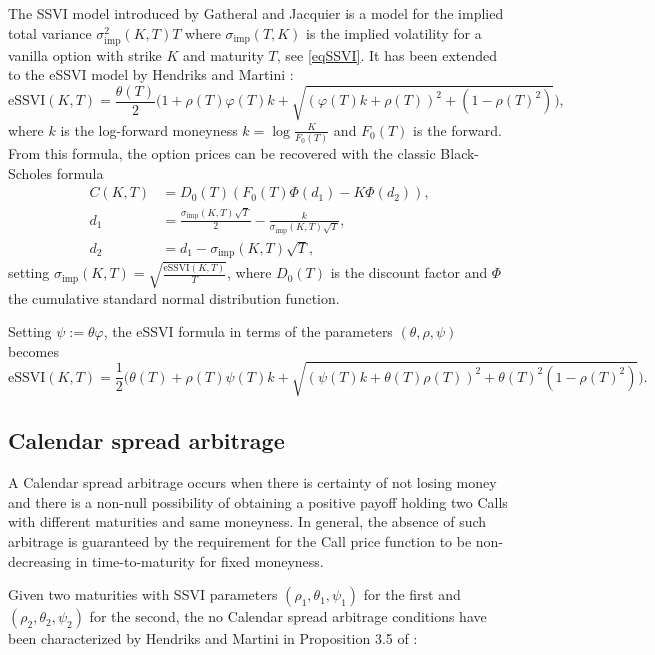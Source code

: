 \documentclass{article}
\begin{document}
	The SSVI model introduced by Gatheral and Jacquier
\cite{gatheral2014arbitrage} is a model for the implied total variance
\(\sigma^2_{\text{imp}}(K,T)T\) where \(\sigma_{\text{imp}}(T,K)\) is
the implied volatility for a vanilla option with strike \(K\) and
maturity \(T\), see \cref{eqSSVI}. It has been extended to the eSSVI
model by Hendriks and Martini \cite{hendriks2019extended}:
\[\text{eSSVI}(K,T) = \frac{\theta(T)}{2}\bigl(1+\rho(T)\varphi(T) k + \sqrt{(\varphi(T) k + \rho(T))^2 + (1-\rho(T)^2)}\bigr),\]
where \(k\) is the log-forward moneyness \(k=\log\frac{K}{F_0(T)}\) and
\(F_0(T)\) is the forward. From this formula, the option prices can be
recovered with the classic Black-Scholes formula \begin{align*}
C(K,T) &= D_0(T)(F_0(T)\Phi(d_1) - K\Phi(d_2)),\\
d_1 &= \frac{\sigma_{\text{imp}}(K,T)\sqrt{T}}2 - \frac{k}{\sigma_{\text{imp}}(K,T)\sqrt{T}},\\
d_2 &= d_1-\sigma_{\text{imp}}(K,T)\sqrt{T},
\end{align*} setting
\(\sigma_{\text{imp}}(K,T) = \sqrt{\frac{\text{eSSVI}(K,T)}T}\), where
\(D_0(T)\) is the discount factor and \(\Phi\) the cumulative standard
normal distribution function.

Setting \(\psi:=\theta\varphi\), the eSSVI formula in terms of the
parameters \((\theta,\rho,\psi)\) becomes
\[\text{eSSVI}(K,T) = \frac{1}{2}\bigl(\theta(T)+\rho(T)\psi(T) k + \sqrt{(\psi(T) k + \theta(T)\rho(T))^2 + \theta(T)^2(1-\rho(T)^2)}\bigr).\]

	\hypertarget{calendar-spread-arbitrage}{%
\subsection{Calendar spread arbitrage}\label{calendar-spread-arbitrage}}

	A Calendar spread arbitrage occurs when there is certainty of not losing
money and there is a non-null possibility of obtaining a positive payoff
holding two Calls with different maturities and same moneyness. In
general, the absence of such arbitrage is guaranteed by the requirement
for the Call price function to be non-decreasing in time-to-maturity for
fixed moneyness.

	Given two maturities with SSVI parameters \((\rho_1,\theta_1,\psi_1)\)
for the first and \((\rho_2,\theta_2,\psi_2)\) for the second, the no
Calendar spread arbitrage conditions have been characterized by Hendriks
and Martini in Proposition 3.5 of \cite{hendriks2019extended}:
\end{document}
